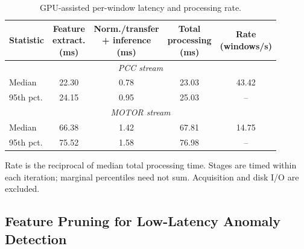 \documentclass[letterpaper,journal]{IEEEtran}
\providecommand{\DIFaddbegin}{} %
\providecommand{\DIFaddend}{} %
\providecommand{\DIFdelbegin}{} %
\providecommand{\DIFdelend}{} %
\begin{document}
\begin{table}[p]
\begin{adjustbox}{max width=\textwidth,max totalheight=0.87\textheight}
\begin{minipage}{\textwidth}
\begin{minipage}[t]{0.48\textwidth}
\centering
\footnotesize
\caption{GPU-assisted per-window latency and processing rate.}
\label{tab:runtime_latency}
\renewcommand{\arraystretch}{1.15}
\setlength{\tabcolsep}{2pt}
\begin{tabular}{@{}lcccc@{}}
\hline
Statistic & \shortstack{Feature\\extract.\\(ms)} & \shortstack{Norm./transfer\\+ inference\\(ms)} & \shortstack{Total\\processing\\(ms)} & \shortstack{Rate\\(windows/s)} \\\hline
\hline\multicolumn{5}{c}{\textit{PCC stream}} \\\hline
Median & 22.30 & 0.78 & 23.03 & 43.42 \\
95th pct. & 24.15 & 0.95 & 25.03 & -- \\
\hline\multicolumn{5}{c}{\textit{MOTOR stream}} \\\hline
Median & 66.38 & 1.42 & 67.81 & 14.75 \\
95th pct. & 75.52 & 1.58 & 76.98 & -- \\
\hline\end{tabular}
\par\smallskip\begin{minipage}{\columnwidth}\scriptsize Rate is the reciprocal of median total processing time. Stages are timed within each iteration; marginal percentiles need not sum. Acquisition and disk I/O are excluded.\end{minipage}

\end{minipage}
\end{minipage}
\end{adjustbox}
\end{table}




\DIFaddend \subsection{Feature Pruning for Low-Latency Anomaly Detection}
\DIFdelbegin %
\DIFdelend \DIFaddbegin \label{sec:feature_pruning}
\end{document}
